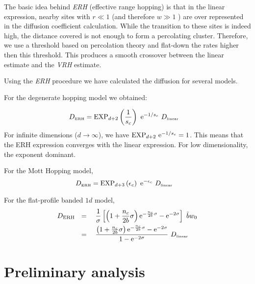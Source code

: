 The basic idea behind \emph{ERH} (effective range hopping) is that in the linear
expression, nearby sites 
with $r\ll 1$ (and therefore $w \gg 1$ ) are over represented in
the diffusion coefficient calculation. While the transition to
these sites is indeed high, the distance covered is not enough
to form a percolating cluster. Therefore, we use a threshold based
on percolation theory and flat-down the rates higher then this threshold.
This produces a smooth crossover between the linear
estimate and the \emph{VRH} estimate.


Using the \emph{ERH} procedure we have calculated the diffusion for several models.


For the degenerate hopping model we obtained:

\begin{align}
D_{\tbox{ERH}} &=  \mathrm{EXP}_{d{+}2}\left(\frac{1}{s_c}\right)  \  \eexp{-1/s_c}  \ D_{\tbox{linear}}
\end{align}
%
For infinite dimensions ($d\rightarrow\infty$),  we have $\mathrm{EXP}_{d{+}2}\  \mbox{e}^{-1/s_c} = 1$. 
This means that the ERH expression converges with the linear expression.
For low dimensionality, the exponent dominant.


For the Mott Hopping model,
%
\begin{align}
D_{\tbox{ERH}} &=\mathrm{EXP}_{d{+}3}\left(\epsilon_c\right)  \  \eexp{-\epsilon_c}  \ D_{\tbox{linear}}
\end{align}
%


For the flat-profile banded $1d$ model,
\begin{align}
D_{\text{ERH}} \ \ &= \ \ 
\ \frac{1}{\sigma}\left[ 
\left(1+\frac{n_c}{2b}\sigma\right)\eexp{-\frac{n_c}{2b}\sigma} - \eexp{-2\sigma}
\right] \ \tilde{b} w_0 \\ &=\ \ 
\ \frac{\left(1+\frac{n_c}{2b}\sigma\right)\eexp{-\frac{n_c}{2b}\sigma} - \eexp{-2\sigma}}
       {1 - \eexp{-2\sigma}}
   \ D_{\tbox{linear}}
\end{align}



\chapter{Preliminary analysis}



